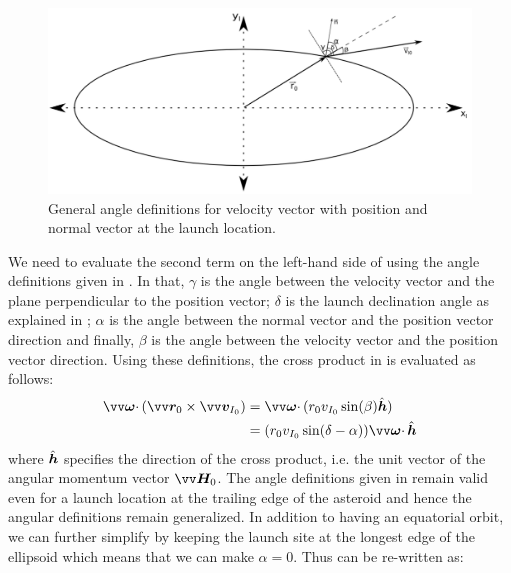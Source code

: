 \begin{figure}[htb]
\centering
\captionsetup{justification=centering}
\includegraphics[width=\textwidth, height=0.3\textheight, keepaspectratio=true]{non_conservative_escape_velocity_angles.pdf}
\caption{General angle definitions for velocity vector with position and normal vector at the launch location.}
\label{fig:velocity_vector_angles}
\end{figure}
\FloatBarrier
We need to evaluate the second term on the left-hand side of  using the angle definitions given in . In that, $\gamma$ is the angle between the velocity vector and the plane perpendicular to the position vector; $\delta$ is the launch declination angle as explained in ; $\alpha$ is the angle between the normal vector and the position vector direction and finally, $\beta$ is the angle between the velocity vector and the position vector direction. Using these definitions, the cross product in  is evaluated as follows:
\begin{align}
    \bv{\omega} \cdotp (\bv{r}_0 \times \bv{v}_{I_0}) &= \bv{\omega} \cdotp (r_0 v_{I_0} \sin(\beta) \buv{h}) \\
    &= (r_0 v_{I_0} \sin(\delta - \alpha)) \bv{\omega} \cdotp \buv{h}
    \label{eqn:cross_product_eval}
\end{align}
where $\hat{\bm{h}}$ specifies the direction of the cross product, i.e. the unit vector of the angular momentum vector $\bv{H}_0$. The angle definitions given in  remain valid even for a launch location at the trailing edge of the asteroid and hence the angular definitions remain generalized. In addition to having an equatorial orbit, we can further simplify  by keeping the launch site at the longest edge of the ellipsoid which means that we can make $\alpha=0$. Thus  can be re-written as:
